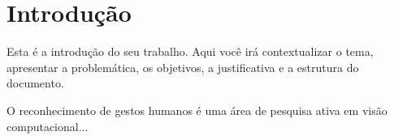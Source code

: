 \documentclass[
	a4paper,      %
	12pt,         %
	english,      %
	oneside,      %
	openany       %
]{abntex2}
\begin{document}
\tableofcontents* %


\textual

\chapter{Introdução}
Esta é a introdução do seu trabalho. Aqui você irá contextualizar o tema, apresentar a problemática, os objetivos, a justificativa e a estrutura do documento.

O reconhecimento de gestos humanos é uma área de pesquisa ativa em visão computacional...

\postextual


\end{document}
